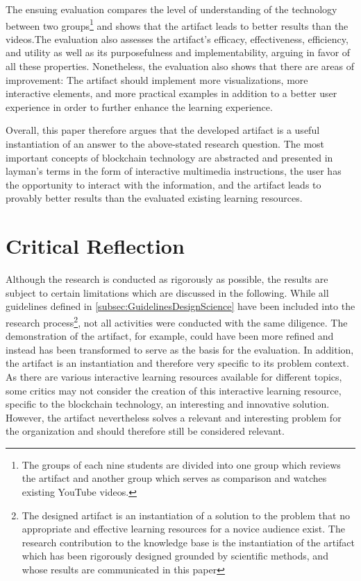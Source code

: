 The ensuing evaluation compares the level of understanding of the technology between two groups\footnote{The groups of each nine students are divided into one group which reviews the artifact and another group which serves as comparison and watches existing YouTube videos.} and shows that the artifact leads to better results than the videos.The evaluation also assesses the artifact's efficacy, effectiveness, efficiency, and utility as well as its purposefulness and implementability, arguing in favor of all these properties. Nonetheless, the evaluation also shows that there are areas of improvement: The artifact should implement more visualizations, more interactive elements, and more practical examples in addition to a better user experience in order to further enhance the learning experience.

Overall, this paper therefore argues that the developed artifact is a useful instantiation of an answer to the above-stated research question. The most important concepts of blockchain technology are abstracted and presented in layman's terms in the form of interactive multimedia instructions, the user has the opportunity to interact with the information, and the artifact leads to provably better results than the evaluated existing learning resources.

\section{Critical Reflection} \label{sec:Reflection}
Although the research is conducted as rigorously as possible, the results are subject to certain limitations which are discussed in the following. 
While all guidelines defined in \ref{subsec:GuidelinesDesignScience} have been included into the research process\footnote{The designed artifact is an instantiation of a solution to the problem that no appropriate and effective learning resources for a novice audience exist. The research contribution to the knowledge base is the instantiation of the artifact which has been rigorously designed grounded by scientific methods, and whose results are communicated in this paper}, not all activities were conducted with the same diligence. The demonstration of the artifact, for example, could have been more refined and instead has been transformed to serve as the basis for the evaluation. In addition, the artifact is an instantiation and therefore very specific to its problem context. As there are various interactive learning resources available for different topics, some critics may not consider the creation of this interactive learning resource, specific to the blockchain technology, an interesting and innovative solution. However, the artifact nevertheless solves a relevant and interesting problem for the organization and should therefore still be considered relevant. 

